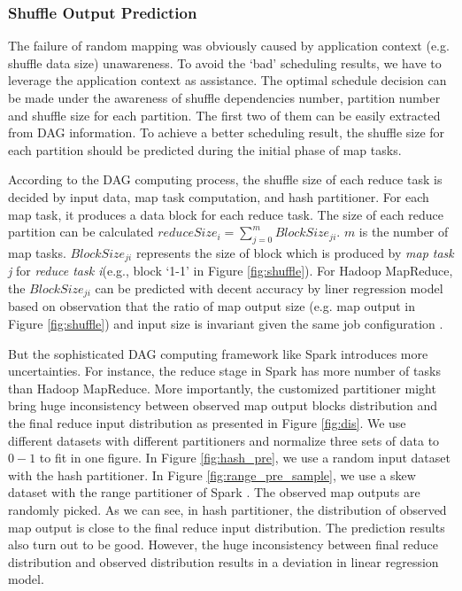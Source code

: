 \subsubsection{Shuffle Output Prediction}\label{shuffleprediction}
The failure of random mapping was obviously caused by application context (e.g. shuffle data size) unawareness. To avoid the `bad' scheduling results, we have to leverage the application context as assistance. The optimal schedule decision can be made under the awareness of shuffle dependencies number, partition number and shuffle size for each partition. The first two of them can be easily extracted from DAG information. To achieve a better scheduling result, the shuffle size for each partition should be predicted during the initial phase of map tasks.

According to the DAG computing process, the shuffle size of each reduce task is decided by input data, map task computation, and hash partitioner. For each map task, it produces a data block for each reduce task. The size of each reduce partition can be calculated $reduceSize_i = \sum_{j=0}^{m} {BlockSize_{ji}}$. $m$ is the number of map tasks. $BlockSize_{ji}$ represents the size of block which is produced by \textit{map task j} for \textit{reduce task i}(e.g., block `1-1' in Figure \ref{fig:shuffle}). For Hadoop MapReduce, the $BlockSize_{ji}$ can be predicted with decent accuracy by liner regression model based on observation that the ratio of map output size (e.g. map output in Figure \ref{fig:shuffle}) and input size is invariant given the same job configuration \cite{ishuffle, predict}.

But the sophisticated DAG computing framework like Spark introduces more uncertainties. For instance, the reduce stage in Spark has more number of tasks than Hadoop MapReduce. More importantly, the customized partitioner might bring huge inconsistency between observed map output blocks distribution and the final reduce input distribution as presented in Figure \ref{fig:dis}. We use different datasets with different partitioners and normalize three sets of data to $0-1$ to fit in one figure. In Figure \ref{fig:hash_pre}, we use a random input dataset with the hash partitioner. In Figure \ref{fig:range_pre_sample}, we use a skew dataset with the range partitioner of Spark \cite{sparksource}.
The observed map outputs are randomly picked. As we can see, in hash partitioner, the distribution of observed map output is close to the final reduce input distribution. The prediction results also turn out to be good. However, the huge inconsistency between final reduce distribution and observed distribution results in a deviation in linear regression model.

